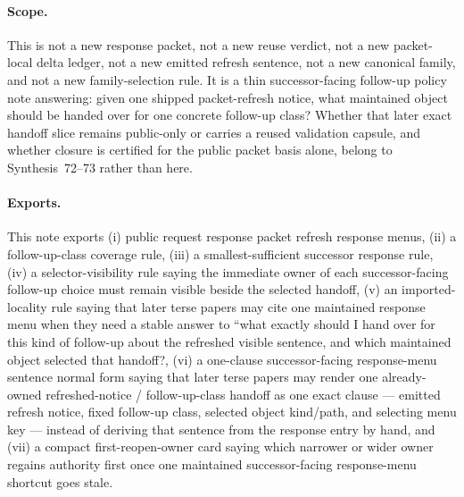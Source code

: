 \documentclass[11pt]{article}
\begin{document}
\paragraph{Scope.}
This is not a new response packet, not a new reuse verdict, not a new packet-local delta ledger, not a new emitted refresh sentence, not a new canonical family, and not a new family-selection rule.
It is a thin successor-facing follow-up policy note answering: given one shipped packet-refresh notice, what maintained object should be handed over for one concrete follow-up class? Whether that later exact handoff slice remains public-only or carries a reused validation capsule, and whether closure is certified for the public packet basis alone, belong to Synthesis~72--73 rather than here.

\paragraph{Exports.}
This note exports (i) public request response packet refresh response menus, (ii) a follow-up-class coverage rule, (iii) a smallest-sufficient successor response rule, (iv) a selector-visibility rule saying the immediate owner of each successor-facing follow-up choice must remain visible beside the selected handoff, (v) an imported-locality rule saying that later terse papers may cite one maintained response menu when they need a stable answer to ``what exactly should I hand over for this kind of follow-up about the refreshed visible sentence, and which maintained object selected that handoff?, (vi) a one-clause successor-facing response-menu sentence normal form saying that later terse papers may render one already-owned refreshed-notice / follow-up-class handoff as one exact clause --- emitted refresh notice, fixed follow-up class, selected object kind/path, and selecting menu key --- instead of deriving that sentence from the response entry by hand, and (vii) a compact first-reopen-owner card saying which narrower or wider owner regains authority first once one maintained successor-facing response-menu shortcut goes stale.
\end{document}
